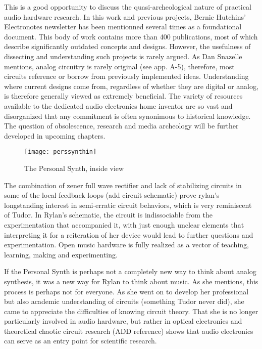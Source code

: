 	This is a good opportunity to discuss the quasi-archeological nature of practical audio hardware research. In this work and previous projects, Bernie Hutchins' Electronotes newsletter has been mentionned several times as a foundational document. This body of work contains more than 400 publications, most of which describe significantly outdated concepts and designs. However, the usefulness of dissecting and understanding such projects is rarely argued. As Dan Snazelle mentions, analog circuitry is rarely original (see app. A-5), therefore, most circuits reference or borrow from previously implemented ideas. Understanding where current designs come from, regardless of whether they are digital or analog, is therefore generally viewed as extremely beneficial. The variety of resources available to the dedicated audio electronics home inventor are so vast and disorganized that any commitment is often synonimous to historical knowledge. The question of obsolescence, research and media archeology will be further developed in upcoming chapters. 
	
	\begin{figure}[h!]
	  \caption{The Personal Synth, inside view}
	  \centering
	    \texttt{[image: perssynthin]}
	\end{figure}
	
	The combination of zener full wave rectifier and lack of stabilizing circuits in some of the local feedback loops (add circuit schematic) prove rylan's longstanding interest in semi-erratic circuit behaviors, which is very reminiscent of Tudor. In Rylan's schematic, the circuit is indissociable from the experimentation that accompanied it, with just enough unclear elements that interpreting it for a reiteration of her device would lead to further questions and experimentation. Open music hardware is fully realized as a vector of teaching, learning, making and experimenting. 
	
	If the Personal Synth is perhaps not a completely new way to think about analog synthesis, it was a new way for Rylan to think about music. As she mentions, this process is perhaps not for everyone. As she went on to develop her professional but also academic understanding of circuits (something Tudor never did), she came to appreciate the difficulties of knowing circuit theory. That she is no longer particularly involved in audio hardware, but rather in optical electronics and theoretical chaotic circuit research (ADD reference) shows that audio electronics can serve as an entry point for scientific research. 


